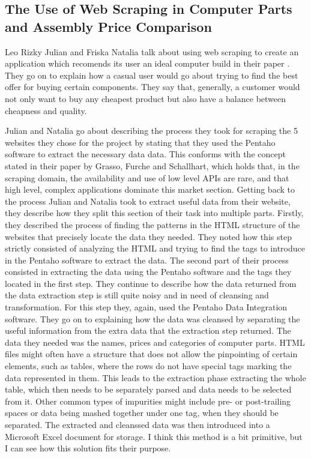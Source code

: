 \documentclass[12pt,a4paper,twoside]{report}
\begin{document}
\subsection{The Use of Web Scraping in Computer Parts and Assembly Price Comparison}

Leo Rizky Julian and Friska Natalia talk about using web scraping to create an application which recomends its user an ideal computer build in their paper \cite{pc_build_tracker}. They go on to explain how a casual user would go about trying to find the best offer for buying certain components. They say that, generally, a customer would not only want to buy any cheapest product but also have a balance between cheapness and quality. 

Julian and Natalia go about describing the process they took for scraping the 5 websites they chose for the project by stating that they used the Pentaho software to extract the necessary data data. This conforms with the concept stated in their paper \cite{oxpath_scraping} by Grasso, Furche and Schallhart, which holds that, in the scraping domain, the availability and use of low level APIs are rare, and that high level, complex applications dominate this market section. Getting back to the process Julian and Natalia took to extract useful data from their website, they describe how they split this section of their task into multiple parts. Firstly, they described the process of finding the patterns in the HTML structure of the websites that precisely locate the data they needed. They noted how this step strictly consisted of analyzing the HTML and trying to find the tags to introduce in the Pentaho software to extract the data. The second part of their process consisted in extracting the data using the Pentaho software and the tags they located in the first step. They continue to describe how the data returned from the data extraction step is still quite noisy and in need of cleansing and transformation. For this step they, again, used the Pentaho Data Integration software. They go on to explaining how the data was cleansed by separating the useful information from the extra data that the extraction step returned. The data they needed was the names, prices and categories of computer parts. HTML files might often have a structure that does not allow the pinpointing of certain elements, such as tables, where the rows do not have special tags marking the data represented in them. This leads to the extraction phase extracting the whole table, which then needs to be separately parsed and data needs to be selected from it. Other common types of impurities might include pre- or post-trailing spaces or data being mashed together under one tag, when they should be separated. The extracted and cleanssed data was then introduced into a Microsoft Excel document for storage. I think this method is a bit primitive, but I can see how this solution fits their purpose.
\end{document}
